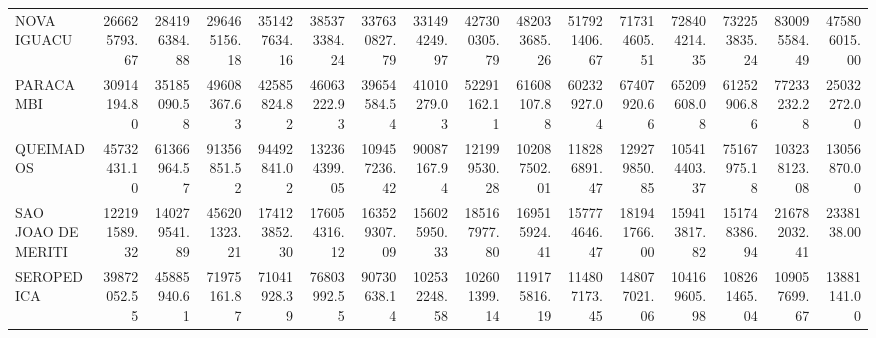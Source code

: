 \begin{table}
\begin{tabular}{lrrrrrrrrrrrrrrr}
NOVA IGUACU & 266625793.67 & 284196384.88 & 296465156.18 & 351427634.16 & 385373384.24 & 337630827.79 & 331494249.97 & 427300305.79 & 482033685.26 & 517921406.67 & 717314605.51 & 728404214.35 & 732253835.24 & 830095584.49 & 475806015.00 \\
PARACAMBI & 30914194.80 & 35185090.58 & 49608367.63 & 42585824.82 & 46063222.93 & 39654584.54 & 41010279.03 & 52291162.11 & 61608107.88 & 60232927.04 & 67407920.66 & 65209608.08 & 61252906.86 & 77233232.28 & 25032272.00 \\
QUEIMADOS & 45732431.10 & 61366964.57 & 91356851.52 & 94492841.02 & 132364399.05 & 109457236.42 & 90087167.94 & 121999530.28 & 102087502.01 & 118286891.47 & 129279850.85 & 105414403.37 & 75167975.18 & 103238123.08 & 13056870.00 \\
SAO JOAO DE MERITI & 122191589.32 & 140279541.89 & 456201323.21 & 174123852.30 & 176054316.12 & 163529307.09 & 156025950.33 & 185167977.80 & 169515924.41 & 157774646.47 & 181941766.00 & 159413817.82 & 151748386.94 & 216782032.41 & 2338138.00 \\
SEROPEDICA & 39872052.55 & 45885940.61 & 71975161.87 & 71041928.39 & 76803992.55 & 90730638.14 & 102532248.58 & 102601399.14 & 119175816.19 & 114807173.45 & 148077021.06 & 104169605.98 & 108261465.04 & 109057699.67 & 13881141.00 \\
\bottomrule
\end{tabular}
\end{table}
